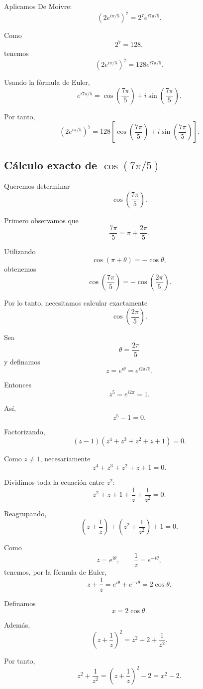 Aplicamos De Moivre:
\[
\left(2e^{i\pi/5}\right)^7
=
2^7e^{i7\pi/5}.
\]

Como
\[
2^7=128,
\]
tenemos
\[
\left(2e^{i\pi/5}\right)^7
=
128e^{i7\pi/5}.
\]

Usando la fórmula de Euler,
\[
e^{i7\pi/5}
=
\cos\left(\frac{7\pi}{5}\right)
+
i\sin\left(\frac{7\pi}{5}\right).
\]

Por tanto,
\[
\boxed{
\left(2e^{i\pi/5}\right)^7
=
128\left[
\cos\left(\frac{7\pi}{5}\right)
+
i\sin\left(\frac{7\pi}{5}\right)
\right]
}.
\]

\subsection{Cálculo exacto de $\cos(7\pi/5)$}

Queremos determinar
\[
\cos\left(\frac{7\pi}{5}\right).
\]

Primero observamos que
\[
\frac{7\pi}{5}
=
\pi+\frac{2\pi}{5}.
\]

Utilizando
\[
\cos(\pi+\theta)=-\cos\theta,
\]
obtenemos
\[
\cos\left(\frac{7\pi}{5}\right)
=
-\cos\left(\frac{2\pi}{5}\right).
\]

Por lo tanto, necesitamos calcular exactamente
\[
\cos\left(\frac{2\pi}{5}\right).
\]

Sea
\[
\theta=\frac{2\pi}{5}
\]
y definamos
\[
z=e^{i\theta}=e^{i2\pi/5}.
\]

Entonces
\[
z^5=e^{i2\pi}=1.
\]

Así,
\[
z^5-1=0.
\]

Factorizando,
\[
(z-1)
\left(
z^4+z^3+z^2+z+1
\right)=0.
\]

Como $z\neq 1$, necesariamente
\[
z^4+z^3+z^2+z+1=0.
\]

Dividimos toda la ecuación entre $z^2$:
\[
z^2+z+1+\frac{1}{z}+\frac{1}{z^2}=0.
\]

Reagrupando,
\[
\left(z+\frac{1}{z}\right)
+
\left(z^2+\frac{1}{z^2}\right)
+1=0.
\]

Como
\[
z=e^{i\theta},
\qquad
\frac{1}{z}=e^{-i\theta},
\]
tenemos, por la fórmula de Euler,
\[
z+\frac{1}{z}
=
e^{i\theta}+e^{-i\theta}
=
2\cos\theta.
\]

Definamos
\[
x=2\cos\theta.
\]

Además,
\[
\left(z+\frac{1}{z}\right)^2
=
z^2+2+\frac{1}{z^2}.
\]

Por tanto,
\[
z^2+\frac{1}{z^2}
=
\left(z+\frac{1}{z}\right)^2-2
=
x^2-2.
\]

